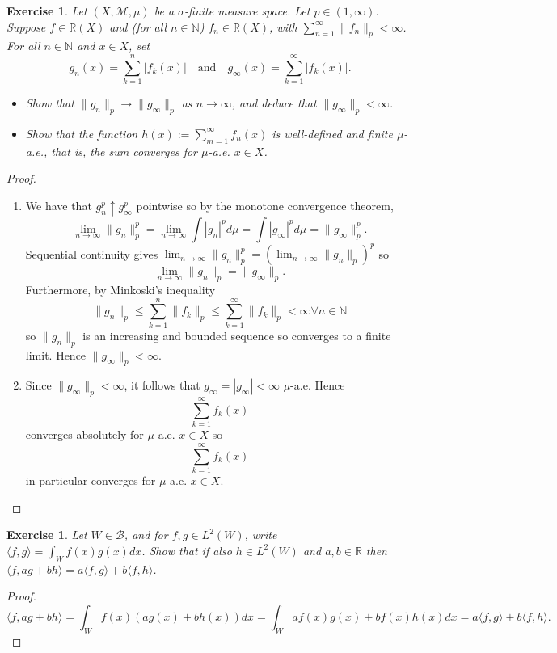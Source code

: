 \documentclass{article}
\newtheorem{exercise}[theorem]{Exercise}
\begin{document}
\begin{exercise}
Let $(X, \mathcal{M}, \mu)$ be a $\sigma$-finite measure space. Let $p \in (1, \infty)$. Suppose $f \in \mathbb{R}(X)$ and (for all $n \in \mathbb{N}$) $f_n \in \mathbb{R}(X)$, with $\sum_{n=1}^{\infty} \|f_n\|_p < \infty$. For all $n \in \mathbb{N}$ and $x \in X$, set
\[
g_n(x) = \sum_{k=1}^{n} |f_k(x)| \quad \text{and} \quad g_{\infty}(x) = \sum_{k=1}^{\infty} |f_k(x)|.
\]
\begin{itemize}
    \item[(i)] Show that $\|g_n\|_p \to \|g_{\infty}\|_p$ as $n \to \infty$, and deduce that $\|g_{\infty}\|_p < \infty$.
    
    \item[(ii)] Show that the function $h(x) := \sum_{m=1}^{\infty} f_n(x)$ is well-defined and finite $\mu$-a.e., that is, the sum converges for $\mu$-a.e. $x \in X$.
\end{itemize}
\end{exercise}
\begin{proof}
\begin{enumerate}
    \item[(a)] We have that $g_n^p\uparrow g_\infty^p$ pointwise so by the monotone convergence theorem,\[\lim_{n\to\infty}\|g_n\|_p^p=\lim_{n\to\infty}\int|g_n|^pd\mu=\int|g_\infty|^pd\mu=\|g_\infty\|_p^p.\] Sequential continuity gives $\lim_{n\to\infty}\|g_n\|_p^p=\left(\lim_{ n\to\infty}\|g_n\|_p\right)^p$ so\[\lim_{n\to\infty}\|g_n\|_p=\|g_\infty\|_p.\] Furthermore, by Minkoski's inequality \[\|g_n\|_p\leq\sum_{k=1}^n\|f_k\|_p\leq\sum_{k=1}^\infty\|f_k\|_p<\infty\forall n\in\mathbb{N}\] so $\|g_n\|_p$ is an increasing and bounded sequence so converges to a finite limit. Hence $\|g_\infty\|_p<\infty$.
    \item[(b)] Since $\|g_\infty\|_p<\infty$, it follows that $g_\infty=|g_\infty|<\infty$ $\mu$-a.e. Hence \[\sum_{k=1}^\infty f_k(x)\] converges absolutely for $\mu$-a.e. $x\in X$ so \[\sum_{k=1}^\infty f_k(x)\] in particular converges for $\mu$-a.e. $x\in X$.
\end{enumerate}
\end{proof}

\begin{exercise}
Let $W \in \mathcal{B}$, and for $f, g \in L^2(W)$, write $\langle f, g \rangle = \int_W f(x)g(x)dx$. Show that if also $h \in L^2(W)$ and $a, b \in \mathbb{R}$ then $\langle f, ag + bh \rangle = a\langle f, g \rangle + b\langle f, h \rangle$.
\end{exercise}
\begin{proof}
\[\langle f,ag+bh\rangle=\int_W f(x)(ag(x)+bh(x))dx=\int_W af(x)g(x)+bf(x)h(x)dx=a\langle f,g\rangle+b\langle f,h\rangle.\]
\end{proof}
\end{document}

